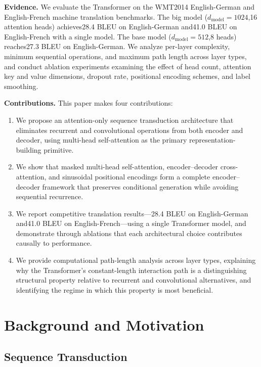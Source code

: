 ﻿\documentclass{article}
\begin{document}
\textbf{Evidence.} We evaluate the Transformer on the WMT2014 English-German and English-French machine translation benchmarks. The big model ($d_{\text{model}}=1024$,16 attention heads) achieves28.4 BLEU on English-German and41.0 BLEU on English-French with a single model. The base model ($d_{\text{model}}=512$,8 heads) reaches27.3 BLEU on English-German. We analyze per-layer complexity, minimum sequential operations, and maximum path length across layer types, and conduct ablation experiments examining the effect of head count, attention key and value dimensions, dropout rate, positional encoding schemes, and label smoothing.

\textbf{Contributions.} This paper makes four contributions:
\begin{enumerate}
 \item We propose an attention-only sequence transduction architecture that eliminates recurrent and convolutional operations from both encoder and decoder, using multi-head self-attention as the primary representation-building primitive.
 \item We show that masked multi-head self-attention, encoder--decoder cross-attention, and sinusoidal positional encodings form a complete encoder--decoder framework that preserves conditional generation while avoiding sequential recurrence.
 \item We report competitive translation results---28.4 BLEU on English-German and41.0 BLEU on English-French---using a single Transformer model, and demonstrate through ablations that each architectural choice contributes causally to performance.
 \item We provide computational path-length analysis across layer types, explaining why the Transformer's constant-length interaction path is a distinguishing structural property relative to recurrent and convolutional alternatives, and identifying the regime in which this property is most beneficial.
\end{enumerate}


\section{Background and Motivation}

\subsection{Sequence Transduction}
\end{document}
